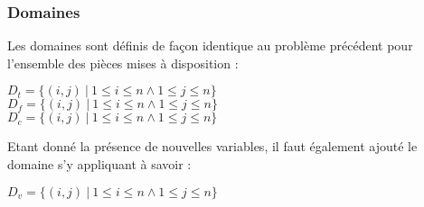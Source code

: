 \documentclass[a4paper]{article}
\begin{document}
\subsubsection{Domaines}
Les domaines sont définis de façon identique au problème précédent pour l'ensemble des pièces mises à disposition : 
\begin{center}
$D_t = \{ (i,j) \ | \ 1 \leq i \leq n \wedge 1 \leq j \leq n \}$ \\
$D_f = \{ (i,j) \ | \ 1 \leq i \leq n \wedge 1 \leq j \leq n \}$ \\
$D_c = \{ (i,j) \ | \ 1 \leq i \leq n \wedge 1 \leq j \leq n \}$ \\
\end{center}
Etant donné la présence de nouvelles variables, il faut également ajouté le domaine s'y appliquant à savoir : 
\begin{center}
$D_v = \{ (i,j) \ | \ 1 \leq i \leq n \wedge 1 \leq j \leq n \}$
\end{center}
\end{document}
